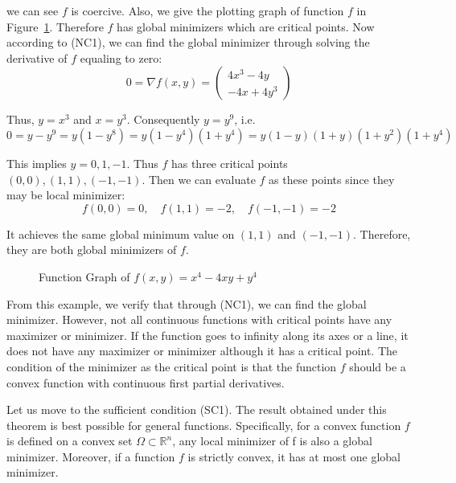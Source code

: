 we can see $f$ is coercive. Also, we give the plotting graph of function $f$ in Figure~\ref{fig:unconseg}. Therefore $f$ has global minimizers which are critical points. Now according to (NC1), we can find the global minimizer through solving the derivative of $f$ equaling to zero:
$$
0=\nabla f(x, y)=\left(\begin{array}{c}4 x^{3}-4 y \\ -4 x+4 y^{3}\end{array}\right)
$$
\par Thus, $y = x^3$ and $x = y^3$. Consequently $y = y^9$, i.e.
$$
0=y-y^{9}=y\left(1-y^{8}\right)=y\left(1-y^{4}\right)\left(1+y^{4}\right)=y(1-y)(1+y)\left(1+y^{2}\right)\left(1+y^{4}\right)
$$
\par This implies $y = 0, 1, -1$. Thus $f$ has three critical points $(0,0), (1,1), (-1,-1)$. Then we can evaluate $f$ as these points since they may be local minimizer:
$$
f(0,0)=0, \quad f(1,1)=-2, \quad f(-1,-1)=-2
$$
\par It achieves the same global minimum value on $(1, 1)$ and $(-1, -1)$. Therefore, they are both global minimizers of $f$. 
\begin{figure}[t]
\label{fig:unconseg}
\centering
{}
\caption{Function Graph of $f(x, y)=x^{4}-4 x y+y^{4}$}
\end{figure}
\par From this example, we verify that through (NC1), we can find the global minimizer. However, not all continuous functions with critical points have any maximizer or minimizer. If the function goes to infinity along its axes or a line, it does not have any maximizer or minimizer although it has a critical point. The condition of the minimizer as the critical point is that the function $f$ should be a convex function with continuous first partial derivatives.
\par Let us move to the sufficient condition (SC1). The result obtained under this theorem is best possible for general functions. Specifically, for a convex function $f$ is defined on a convex set $\Omega \subset \mathbb{R}^n$, any local minimizer of f is also a global minimizer. Moreover, if a function $f$ is strictly convex, it has at most one global minimizer. 

